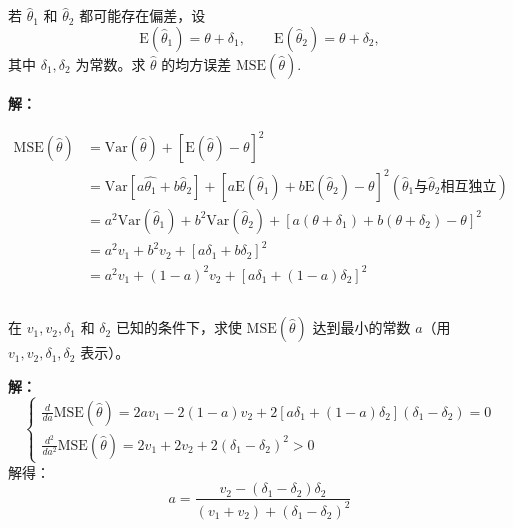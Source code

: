 \documentclass[12pt,a4paper]{article}
\begin{document}
\subsection{}

若 $\hat{\theta}_1$ 和 $\hat{\theta}_2$ 都可能存在偏差，设
    \[
        \mathrm{E}(\hat{\theta}_1)=\theta+\delta_1,\qquad \mathrm{E}(\hat{\theta}_2)=\theta+\delta_2,
    \]
    其中 $\delta_1,\delta_2$ 为常数。求 $\hat{\theta}$ 的均方误差 $\mathrm{MSE}(\hat{\theta})$.

\begin{answerbox}
\textbf{解：}

$$
\begin{aligned}
\mathrm{MSE}(\hat{\theta}) &= \mathrm{Var}(\hat{\theta}) + [\mathrm{E}(\hat{\theta}) - \theta]^2 \\ 
  &= \mathrm{Var}{[a\hat{\theta_1} + b\hat{\theta}_2]} + [a\mathrm{E}(\hat{\theta}_1) + b\mathrm{E}(\hat{\theta}_2) - \theta]^2 (\hat{\theta}_1 与 \hat{\theta}_2 \text{相互独立})\\
  &= a^2 \mathrm{Var}(\hat{\theta}_1) + b^2 \mathrm{Var}(\hat{\theta}_2) + [a(\theta+\delta_1) + b(\theta+\delta_2) - \theta]^2 \\
  &= a^2 v_1 + b^2 v_2 + [a\delta_1 + b\delta_2]^2 \\
  &= a^2 v_1 + (1-a)^2 v_2 + [a\delta_1 + (1-a)\delta_2]^2
\end{aligned}
$$
\end{answerbox}

\subsection{}
在 $v_1,v_2,\delta_1$ 和 $\delta_2$ 已知的条件下，求使 $\mathrm{MSE}(\hat{\theta})$ 达到最小的常数 $a$（用 $v_1,v_2,\delta_1,\delta_2$ 表示）。

\begin{answerbox}
  \textbf{解：}
  $$
  \left\{
    \begin{array}{l}
      \frac{d}{da} \mathrm{MSE}(\hat{\theta}) = 2a v_1 - 2(1-a) v_2 + 2[a\delta_1 + (1-a)\delta_2](\delta_1 - \delta_2) = 0 \\
      \frac{d^2}{da^2} \mathrm{MSE}(\hat{\theta}) = 2v_1 + 2v_2 + 2(\delta_1 - \delta_2)^2 > 0
    \end{array}
  \right.
  $$
  解得：
  $$
  a = \frac{v_2 - (\delta_1 - \delta_2)\delta_2}{(v_1 + v_2)+(\delta_1 - \delta_2)^2}
  $$
\end{answerbox}
\end{document}
